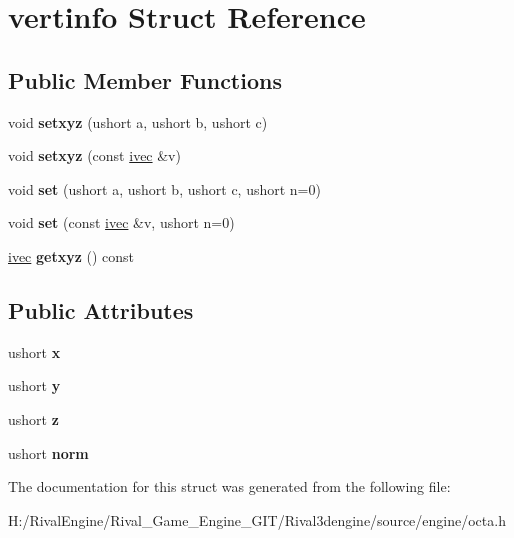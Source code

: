 \hypertarget{structvertinfo}{}\section{vertinfo Struct Reference}
\label{structvertinfo}
\subsection*{Public Member Functions}
\begin{DoxyCompactItemize}
\item 
\mbox{\label{structvertinfo_a85a48d97cc5c704c1462a85b1feff0b6}} 
void {\bfseries setxyz} (ushort a, ushort b, ushort c)
\item 
\mbox{\label{structvertinfo_acae011bd38bb01ab2352702add2fd255}} 
void {\bfseries setxyz} (const \hyperlink{structivec}{ivec} \&v)
\item 
\mbox{\label{structvertinfo_aecbff3320b1ae4118f599fa9e9cd9fe1}} 
void {\bfseries set} (ushort a, ushort b, ushort c, ushort n=0)
\item 
\mbox{\label{structvertinfo_a6c4b47b86f26d302a419e4850bbd806c}} 
void {\bfseries set} (const \hyperlink{structivec}{ivec} \&v, ushort n=0)
\item 
\mbox{\label{structvertinfo_a01cd323ef0dd76054aefad3205d4a8db}} 
\hyperlink{structivec}{ivec} {\bfseries getxyz} () const
\end{DoxyCompactItemize}
\subsection*{Public Attributes}
\begin{DoxyCompactItemize}
\item 
\mbox{\label{structvertinfo_abaaa817d5071a230517246dec8c23437}} 
ushort {\bfseries x}
\item 
\mbox{\label{structvertinfo_a16698d91c8f5b956fb74e93e2713a491}} 
ushort {\bfseries y}
\item 
\mbox{\label{structvertinfo_afeede259725d36bf0230ce71049da61f}} 
ushort {\bfseries z}
\item 
\mbox{\label{structvertinfo_a1f1c97035a7c5fafa39fb9a55b71c378}} 
ushort {\bfseries norm}
\end{DoxyCompactItemize}


The documentation for this struct was generated from the following file\+:\begin{DoxyCompactItemize}
\item 
H\+:/\+Rival\+Engine/\+Rival\+\_\+\+Game\+\_\+\+Engine\+\_\+\+G\+I\+T/\+Rival3dengine/source/engine/octa.\+h\end{DoxyCompactItemize}
